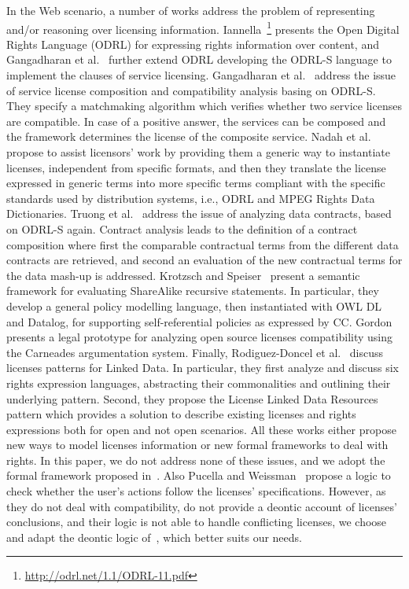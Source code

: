 In the Web scenario, a number of works address the problem of representing and/or reasoning over licensing information.
Iannella~\footnote{\url{http://odrl.net/1.1/ODRL-11.pdf}} presents the Open Digital Rights Language (ODRL) for expressing rights information over content, and Gangadharan et al.~\cite{ODRLS} further extend ODRL developing the ODRL-S language to implement the clauses of service licensing.
%
Gangadharan et al.~\cite{DBLP:conf/icsoc/GangadharanWDI07} address the issue of service license composition and compatibility analysis basing on ODRL-S. They specify a matchmaking algorithm which verifies whether two service licenses are compatible. In case of a positive answer, the services can be composed and the framework determines the license of the composite service.
%
Nadah et al.~\cite{DBLP:conf/icail/NadahRB07} propose to assist licensors' work by providing them a generic way to instantiate licenses, independent from specific formats, and then they translate the license expressed in generic terms into more specific terms compliant with the specific standards used by distribution systems, i.e., ODRL and MPEG Rights Data Dictionaries.
%
Truong et al.~\cite{DBLP:conf/apscc/TruongGCDP11} address the issue of analyzing data contracts, based on ODRL-S again. Contract analysis leads to the definition of a contract composition where first the comparable contractual terms from the different data contracts are retrieved, and second an evaluation of the new contractual terms for the data mash-up is addressed.
%
Krotzsch and Speiser~\cite{DBLP:conf/semweb/KrotzschS11} present a semantic framework for evaluating ShareAlike recursive statements. In particular, they develop a general policy modelling language, then instantiated with OWL DL and Datalog, for supporting self-referential policies as expressed by CC.
%
Gordon~\cite{DBLP:conf/icail/Gordon11} presents a legal prototype for analyzing open source licenses compatibility using the Carneades argumentation system.
%
Finally, Rodiguez-Doncel et al.~\cite{victorPatterns2013a,victorPatterns2013b} discuss licenses patterns for Linked Data. In particular, they first analyze and discuss six rights expression languages, abstracting their commonalities and outlining their underlying pattern. Second, they propose the License Linked Data Resources pattern which provides a solution to describe existing licenses and rights expressions both for open and not open scenarios.
All these works either propose new ways to model licenses information or new formal frameworks to deal with rights. In this paper, we do not address none of these issues, and we adopt the formal framework proposed in~\cite{DBLP:conf/semweb/GovernatoriRVG13}. Also Pucella and Weissman~\cite{DBLP:conf/csfw/PucellaW02} propose a logic to check whether the user's actions follow the licenses' specifications. However, as they do not deal with compatibility, do not provide a deontic account of licenses' conclusions, and their logic is not able to handle conflicting licenses, we choose and adapt the deontic logic of~\cite{DBLP:conf/semweb/GovernatoriRVG13}, which better suits our needs.

